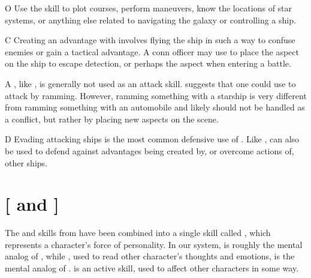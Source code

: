 \documentclass[12pt,titlepage,openany]{book}
\begin{document}
\vspace{1ex}

\begin{NewSkillAction}{O}
    Use the  skill to plot courses, perform maneuvers, know the
    locations of star systems, or anything else related to navigating the
    galaxy or controlling a ship.
\end{NewSkillAction}

\begin{NewSkillAction}{C}
    Creating an advantage with  involves flying the ship in such a
    way to confuse enemies or gain a tactical advantage. A conn officer may use
     to place the aspect  on the ship
    to escape detection, or perhaps the aspect 
    when entering a battle.
\end{NewSkillAction}

\begin{NewSkillAction}{A}
    , like , is generally not used as an attack
    skill. \FateCore{} suggests that one could use  to attack by
    ramming. However, ramming something with a starship is very different from
    ramming something with an automobile and likely should not be handled as a
    conflict, but rather by placing new aspects on the scene.
\end{NewSkillAction}

\begin{NewSkillAction}{D}
    Evading attacking ships is the most common defensive use of .
    Like ,  can also be used to defend against
    advantages being created by, or overcome actions of, other ships.
\end{NewSkillAction}

\section{ [ and ]}\label{sec:presence}

The  and  skills from \FateCore{} have been
combined into a single skill called , which represents a
character's force of personality. In our system,  is roughly
the mental analog of , while , used to read other
character's thoughts and emotions, is the mental analog of .
 is an active skill, used to affect other characters in some
way.
\end{document}
